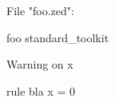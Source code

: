 File "foo.zed":
\begin{zsection}
 \SECTION foo \parents standard\_toolkit
\end{zsection}

Warning on x
\begin{theorem}{rule bla}
 x = 0
\end{theorem}

